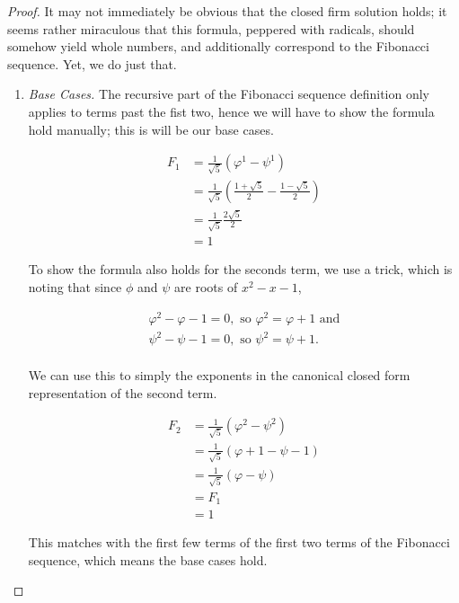 \documentclass[twoside]{report}
\begin{document}
\begin{proof}
	It may not immediately be obvious that the closed firm solution holds; it seems rather miraculous that this formula, peppered with radicals, should somehow yield whole numbers, and additionally correspond to the Fibonacci sequence. Yet, we do just that.
	
	\vspace{\baselineskip}
	\begin{enumerate}
		\item \emph{Base Cases.}
		The recursive part of the Fibonacci sequence definition only applies to terms past the fist two, hence we will have to show the formula hold manually; this is will be our base cases.
		
		\begin{align*}
			F_1 &= \frac{1}{\sqrt{5}}\left( \varphi^1 - \psi^1 \right) \\
			&= \frac{1}{\sqrt{5}}\left( \frac{1 + \sqrt{5}}{2} - \frac{1 - \sqrt{5}}{2} \right) \\
			&= \frac{1}{\sqrt{5}} \frac{2\sqrt{5}}{2} \\
			&= 1
		\end{align*}
		
		To show the formula also holds for the seconds term, we use a trick, which is noting that since $\phi$ and $\psi$ are roots of $x^2 - x - 1$,
		
		\begin{align*}
			\varphi^2 - \varphi - 1 = 0, \text{ so } \varphi^2 = \varphi + 1 \text{ and} \\
			\psi^2 - \psi - 1 = 0, \text{ so } \psi^2 = \psi + 1. \\
		\end{align*}
		
		We can use this to simply the exponents in the canonical closed form representation of the second term.
		
		\begin{align*}
			F_2 &= \frac{1}{\sqrt{5}}\left( \varphi^2 - \psi^2 \right) \\
			&= \frac{1}{\sqrt{5}}\left( \varphi + 1 - \psi - 1 \right) \\
			&= \frac{1}{\sqrt{5}}\left( \varphi - \psi \right) \\
			&= F_1 \\
			&= 1
		\end{align*}
		
		This matches with the first few terms of the first two terms of the Fibonacci sequence, which means the base cases hold.
		

\end{enumerate}
\end{proof}
\end{document}
